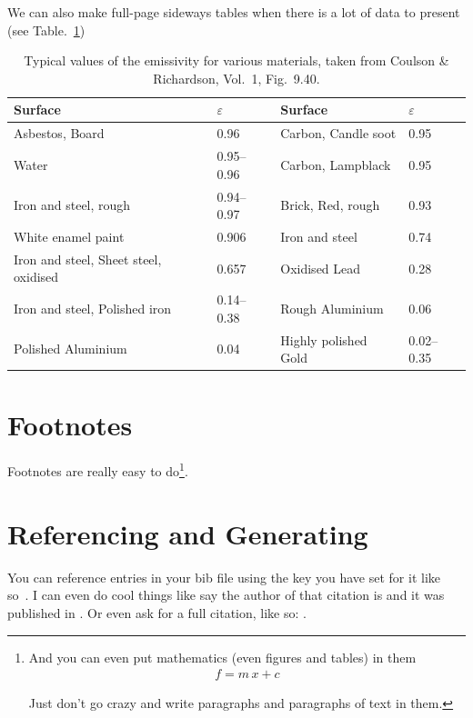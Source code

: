 \documentclass[12pt,MEng]{UoAThesis}
\begin{document}
We can also make full-page sideways tables when there is a lot of data
to present (see Table.~\ref{tab:BigTable})
\begin{table}
  \begin{center}
    \begin{tabular}{|p{6.5cm}|p{2.0cm}|||p{4.5cm}|p{2.5cm}|}
      Surface & $\varepsilon$ & Surface & $\varepsilon$ 
      \\\hline\hline%
      Asbestos, Board & 0.96 & Carbon, Candle soot & 0.95 \\
      Water & 0.95--0.96 & Carbon, Lampblack & 0.95\\
      Iron and steel, rough & 0.94--0.97 & Brick, Red, rough & 0.93\\
      White enamel paint & 0.906 & Iron and steel & 0.74\\
      Iron and steel, Sheet steel, oxidised & 0.657 & Oxidised Lead  & 0.28\\
      Iron and steel, Polished iron & 0.14--0.38 & Rough Aluminium & 0.06\\
      Polished Aluminium & 0.04 & Highly polished Gold & 0.02--0.35
    \end{tabular}
  \end{center}
  \caption[Typical values of the emissivity for various materials (sideways)]{
    \label{tab:BigTable}Typical values of the emissivity for various materials, 
    taken from Coulson \& Richardson, Vol.~1, Fig.~9.40.
}
\end{table}

\section{Footnotes}
Footnotes are really easy to do\footnote{And you can even put mathematics (even figures and tables) in them 
  \begin{align}
    f=m\,x+c
  \end{align}
  
  Just don't go crazy and write paragraphs and paragraphs of text in
  them. 
}.

\section{Referencing and Generating}
You can reference entries in your bib file using the key you have set
for it like so~\cite{Bannerman_2009}. I can even do cool things like
say the author of that citation is \citeauthor{Bannerman_2009} and it
was published in \citeyear{Bannerman_2009}. Or even ask for a full
citation, like so: .
\end{document}
